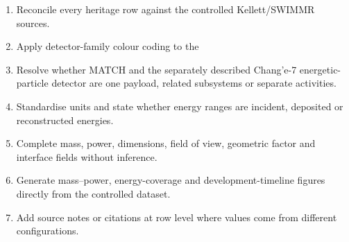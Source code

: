 \begin{enumerate}[leftmargin=*]
\item Reconcile every heritage row against the controlled Kellett/SWIMMR sources.
\item Apply detector-family colour coding to the %
\item Resolve whether MATCH and the separately described Chang'e-7 energetic-particle detector are one payload, related subsystems or separate activities.
\item Standardise units and state whether energy ranges are incident, deposited or reconstructed energies.
\item Complete mass, power, dimensions, field of view, geometric factor and interface fields without inference.
\item Generate mass--power, energy-coverage and development-timeline figures directly from the controlled dataset.
\item Add source notes or citations at row level where values come from different configurations.
\end{enumerate}

